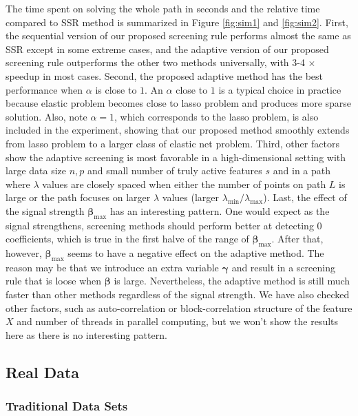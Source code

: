 The time spent on solving the whole path in seconds and the relative time compared to SSR method is summarized in Figure \ref{fig:sim1} and \ref{fig:sim2}. First, the sequential version of our proposed screening rule performs almost the same as SSR except in some extreme cases, and the adaptive version of our proposed screening rule outperforms the other two methods universally, with 3-4 $\times$ speedup in most cases. Second, the proposed adaptive method has the best performance when $\alpha$ is close to $1$. An $\alpha$ close to $1$ is a typical choice in practice because elastic problem becomes close to lasso problem and produces more sparse solution. Also, note $\alpha=1$, which corresponds to the lasso problem, is also included in the experiment, showing that our proposed method smoothly extends from lasso problem to a larger class of elastic net problem. Third, other factors show the adaptive screening is most favorable in a high-dimensional setting with large data size $n,p$ and small number of truly active features $s$ and in a path where $\lambda$ values are closely spaced when either the number of points on path $L$ is large or the path focuses on larger $\lambda$ values (larger $\lambda_{\min}/\lambda_{\max}$). Last, the effect of the signal strength $\boldsymbol\beta_{\max}$ has an interesting pattern. One would expect as the signal strengthens, screening methods should perform better at detecting 0 coefficients, which is true in the first halve of the range of $\boldsymbol\beta_{\max}$. After that, however, $\boldsymbol\beta_{\max}$ seems to have a negative effect on the adaptive method. The reason may be that we introduce an extra variable $\boldsymbol\gamma$ and result in a screening rule that is loose when $\boldsymbol\beta$ is large. Nevertheless, the adaptive method is still much faster than other methods regardless of the signal strength. We have also checked other factors, such as auto-correlation or block-correlation structure of the feature $X$ and number of threads in parallel computing, but we won't show the results here as there is no interesting pattern.

\subsection{Real Data}

\subsubsection{Traditional Data Sets}

